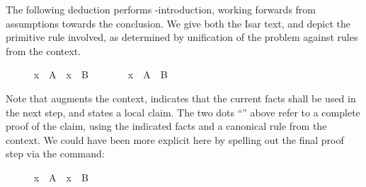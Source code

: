 \begin{isabellebody}
\begin{isamarkuptext}
  \medskip The following deduction performs \isa{{\isachardoublequote}{\isasyminter}{\isachardoublequote}}-introduction,
  working forwards from assumptions towards the conclusion.  We give
  both the Isar text, and depict the primitive rule involved, as
  determined by unification of the problem against rules from the
  context.%
\end{isamarkuptext}%
\isamarkuptrue%
%
\medskip\begin{minipage}{0.6\textwidth}
%
\isadelimproof
%
\endisadelimproof
%
\isatagproof
\ \ \ \ \isamarkupfalse%
\ {\isachardoublequoteopen}x\ {\isasymin}\ A{\isachardoublequoteclose}\ \ {\isachardoublequoteopen}x\ {\isasymin}\ B{\isachardoublequoteclose}\isanewline
\ \ \ \ \isamarkupfalse%
\ \isamarkupfalse%
\ {\isachardoublequoteopen}x\ {\isasymin}\ A\ {\isasyminter}\ B{\isachardoublequoteclose}\ \isacommand{{\isachardot}{\isachardot}}\isamarkupfalse%
%
\endisatagproof
{\isafoldproof}%
%
\isadelimproof
%
\endisadelimproof
%
\end{minipage}\begin{minipage}{0.4\textwidth}
%
\begin{isamarkuptext}%
%
\end{isamarkuptext}%
\isamarkuptrue%
%
\end{minipage}
%
\begin{isamarkuptext}%
\medskip\noindent Note that \hyperlink{command.assume}{\mbox{}} augments the
  context, \hyperlink{command.then}{\mbox{}} indicates that the current facts shall be
  used in the next step, and \hyperlink{command.have}{\mbox{}} states a local claim.
  The two dots ``\hyperlink{command.ddot}{\mbox{\isa{\isacommand{{\isachardot}{\isachardot}}}}}'' above refer to a complete proof of
  the claim, using the indicated facts and a canonical rule from the
  context.  We could have been more explicit here by spelling out the
  final proof step via the \hyperlink{command.by}{\mbox{}} command:%
\end{isamarkuptext}%
\isamarkuptrue%
%
\isadelimproof
%
\endisadelimproof
%
\isatagproof
\ \ \ \ \isamarkupfalse%
\ {\isachardoublequoteopen}x\ {\isasymin}\ A{\isachardoublequoteclose}\ \ {\isachardoublequoteopen}x\ {\isasymin}\ B{\isachardoublequoteclose}\isanewline

\end{isabellebody}
